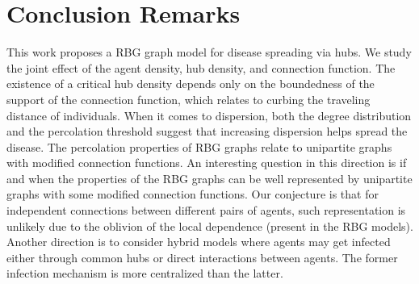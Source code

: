 \section{Conclusion Remarks}
This work proposes a RBG graph model for disease spreading via hubs. We study the joint effect of the agent density, hub density, and connection function. The existence of a critical hub density depends only on the boundedness of the support of the connection function, which relates to curbing the traveling distance of individuals. When it comes to dispersion, both the degree distribution and the percolation threshold suggest that increasing dispersion helps spread the disease. The percolation properties of RBG graphs relate to unipartite graphs with modified connection functions. 
An interesting question in this direction is if and when the properties of the RBG graphs can be well represented by unipartite graphs with some modified connection functions. Our conjecture is that for independent connections between different pairs of agents, such representation is unlikely due to the oblivion of the local dependence (present in the RBG models). 
 Another direction is to consider hybrid models where agents may get infected either through common hubs or direct interactions between agents. The former infection mechanism is more centralized than the latter. 